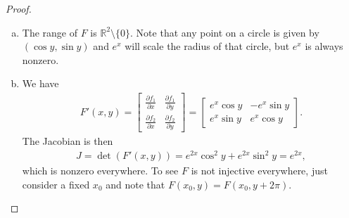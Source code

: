\documentclass[leqno]{article}
\theoremstyle{nonumberplain}
\newtheorem{proof}{Proof}
\newcommand{\R}{\mathbb{R}}
\begin{document}
\begin{proof} ~
\begin{enumerate}[(a)]

\item The range of $F$ is $\R^2 \setminus \{0\}$. Note that any point on a circle is given by $(\cos y, \sin y)$ and $e^x$ will scale the radius of that circle, but $e^x$ is always nonzero.

\item We have
\begin{align*}
F'(x,y)=\begin{bmatrix}
\frac{\partial f_1}{\partial x} & \frac{\partial f_1}{\partial y}\\
\frac{\partial f_2}{\partial x} & \frac{\partial f_2}{\partial y}
\end{bmatrix}=
\begin{bmatrix}
e^x \cos y & -e^x \sin y\\
e^x \sin y & e^x \cos y
\end{bmatrix}.
\end{align*} 
The Jacobian is then 
\begin{align*}
J=\det(F'(x,y))=e^{2x} \cos^2 y + e^{2x} \sin^2 y = e^{2x},
\end{align*}
which is nonzero everywhere. To see $F$ is not injective everywhere, just consider a fixed $x_0$ and note that $F(x_0,y)=F(x_0,y+2\pi)$.


\end{enumerate}
\end{proof}
\end{document}
